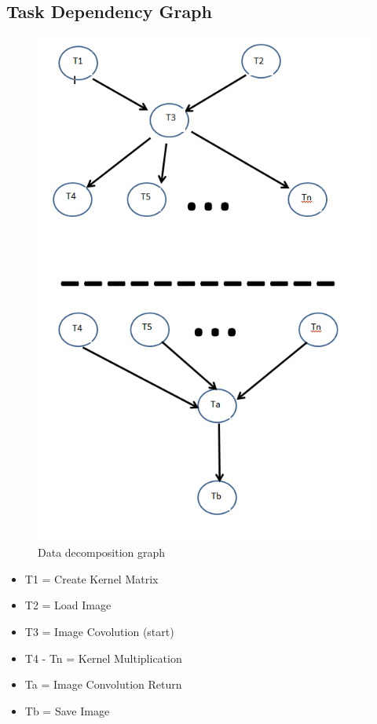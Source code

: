 \documentclass[paper=a4, fontsize=11pt]{scrartcl} %
\numberwithin{equation}{section} %
\numberwithin{figure}{section} %
\numberwithin{table}{section} %
\begin{document}
\subsection{Task Dependency Graph}
\begin{figure}[H]
	\centering
	\includegraphics[scale=0.5]{"td2"}
	\caption{Data decomposition graph}
        \label{kernels}
\end{figure}

\begin{itemize}
\item T1 = Create Kernel Matrix
\item T2 = Load Image
\item T3 = Image Covolution (start)
\item T4 - Tn = Kernel Multiplication
\item Ta = Image Convolution Return
\item Tb = Save Image
\end{itemize}
\end{document}
